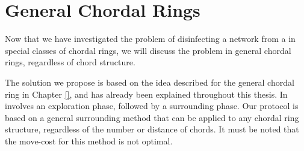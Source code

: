 \chapter {General Chordal Rings}
\label{GL}
Now that we have investigated the problem of disinfecting a network from a  \bv   in   special  classes of chordal rings, we will discuss the problem in general chordal rings, regardless of chord structure.  


The solution  we propose is based on the  idea described for the general chordal ring in Chapter \ref{}, and has already been explained throughout this thesis. In involves an exploration phase, followed by a surrounding phase. Our protocol is based on a general surrounding method that can be applied to any chordal ring structure, regardless of the number or distance of chords. It must be noted that the move-cost for this method is not optimal.

 


